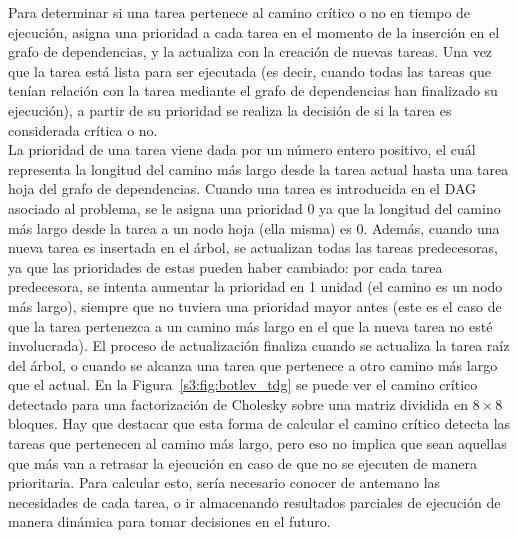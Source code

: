 Para determinar si una tarea pertenece al camino crítico o no en tiempo de
ejecución, \botlev asigna una prioridad a cada tarea en el momento de la
inserción en el grafo de dependencias, y la actualiza con la creación de
nuevas tareas. Una vez que la tarea está lista para ser ejecutada (es
decir, cuando todas las tareas que tenían relación con la tarea mediante el
grafo de dependencias han finalizado su ejecución), a partir de su
prioridad se realiza la decisión de si la tarea es considerada crítica o no.\\
La prioridad de una tarea viene dada por un número entero positivo, el cuál
representa la longitud del camino más largo desde la tarea actual hasta una
tarea hoja del grafo de dependencias. Cuando una tarea es introducida en el
DAG asociado al problema, se le asigna una prioridad 0 ya que la longitud
del camino más largo desde la tarea a un nodo hoja (ella misma) es
0. Además, cuando una nueva tarea es insertada en el árbol, se actualizan
todas las tareas predecesoras, ya que las prioridades de estas pueden haber
cambiado: por cada tarea predecesora, se intenta aumentar la prioridad en 1
unidad (el camino es un nodo más largo), siempre que no tuviera una
prioridad mayor antes (este es el caso de que la tarea pertenezca a un
camino más largo en el que la nueva tarea no esté involucrada). El proceso
de actualización finaliza cuando se actualiza la tarea raíz del árbol, o
cuando se alcanza una tarea que pertenece a otro camino más largo que el
actual. En la Figura~\ref{s3:fig:botlev_tdg} se puede ver el camino crítico
detectado para una factorización de Cholesky sobre una matriz dividida en
$8\times8$ bloques. Hay que destacar que esta forma de calcular el camino
crítico detecta las tareas que pertenecen al camino más largo, pero eso no
implica que sean aquellas que más van a retrasar la ejecución en caso de
que no se ejecuten de manera prioritaria. Para calcular esto, sería
necesario conocer de antemano las necesidades de cada tarea, o ir
almacenando resultados parciales de ejecución de manera dinámica para tomar
decisiones en el futuro.

